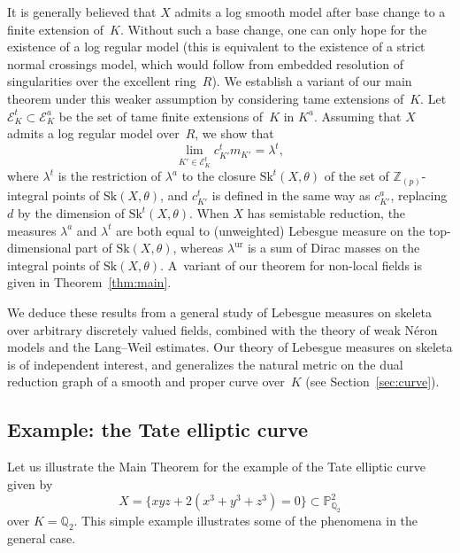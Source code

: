 \documentclass[JEP,XML,SOM,Unicode,NoFloatCountersInSection]{cedram}
\let\mathcal\mathscr
\theoremstyle{definition}
\numberwithin{equation}{subsection}
\newcommand{\Z}{\ensuremath{\mathbb{Z}}}
\newcommand{\Q}{\ensuremath{\mathbb{Q}}}
\newcommand{\Pro}{\ensuremath{\mathbb{P}}}
\newcommand{\Sk}{\mathrm{Sk}}
\newcommand{\ur}{\mathrm{ur}}
\let\form\theta
\let\Leb\lambda
\begin{document}
It is generally believed that $X$ admits a log smooth model after base change to a finite extension of~$K$. Without such a base change, one can only hope for the existence of a log regular model (this is equivalent to the existence of a strict normal crossings model, which would follow from embedded resolution of singularities over the excellent ring~$R$). We establish a variant of our main theorem under this weaker assumption by considering tame extensions of~$K$.
Let $\mathcal{E}^t_K\subset\mathcal{E}^a_K$ be the set of tame finite extensions of~$K$ in $K^a$.
Assuming that $X$ admits a log regular model over~$R$, we show that
\begin{equation*}
\lim_{K'\in\mathcal{E}^t_K}c_{K'}^t m_{K'}=\Leb^t,
\end{equation*}
where $\Leb^t$ is the restriction of $\Leb^a$ to the closure $\Sk^t(X,\form)$ of the set of $\Z_{(p)}$-integral points of
$\Sk(X,\form)$, and $c_{K'}^t$ is defined in the same way as $c^a_{K'}$, replacing $d$ by the dimension of $\Sk^t(X,\form)$.
When $X$ has semistable reduction, the measures $\Leb^a$ and $\Leb^t$ are both equal to (unweighted) Lebesgue measure on the top-dimensional part of $\Sk(X,\form)$, whereas $\Leb^{\ur}$ is a sum of Dirac masses on the
integral points of $\Sk(X,\form)$.
A~variant of our theorem for non-local fields is given in Theorem~\ref{thm:main}.

We deduce these results from a general study of Lebesgue measures on skeleta over arbitrary discretely valued fields, combined with the theory of weak Néron models and the Lang--Weil estimates. Our theory of Lebesgue measures on skeleta is of independent interest, and generalizes the natural metric on the dual reduction graph of a smooth and proper curve over~$K$ (see Section~\ref{sec:curve}).

\subsection*{Example: the Tate elliptic curve}
Let us illustrate the Main Theorem for the example of the Tate elliptic curve given by
\begin{equation}\label{eq:Tate}
X=\{xyz+2(x^3+y^3+z^3)=0\}\subset\Pro^2_{\Q_2}\tag{$*$}
\end{equation}
over $K=\Q_2$. This simple example illustrates some of the phenomena in the general case.
\end{document}
